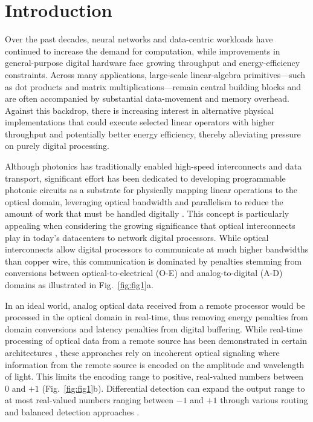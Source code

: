 \documentclass[%
 aip,
 apl,
 amsmath,amssymb,
 reprint,%
 floatfix,
]{revtex4-1}
\begin{document}
\maketitle

\section{Introduction}

Over the past decades, neural networks and data-centric workloads have continued to increase the demand for computation, while improvements in general-purpose digital hardware face growing throughput and energy-efficiency constraints. Across many applications, large-scale linear-algebra primitives---such as dot products and matrix multiplications---remain central building blocks and are often accompanied by substantial data-movement and memory overhead. Against this backdrop, there is increasing interest in alternative physical implementations that could execute selected linear operators with higher throughput and potentially better energy efficiency, thereby alleviating pressure on purely digital processing.

Although photonics has traditionally enabled high-speed interconnects and data transport, significant effort has been dedicated to developing programmable photonic circuits as a substrate for physically mapping linear operations to the optical domain, leveraging optical bandwidth and parallelism to reduce the amount of work that must be handled digitally \cite{Bogaerts2020Nature_ProgrammablePICs_Review,Tait2014JLT_BroadcastAndWeight,Feldmann2021Nature_PhotonicTensorCore,Tait2017SciRep_NeuromorphicWeightBanks,Shen2017NatPhoton_CoherentNanophotonicDL,Hamerly2019PRX_PhotoelectricMultiplication}. This concept is particularly appealing when considering the growing significance that optical interconnects play in today's datacenters to network digital processors. While optical interconnects allow digital processors to communicate at much higher bandwidths than copper wire, this communication is dominated by penalties stemming from conversions between optical-to-electrical (O-E) and analog-to-digital (A-D) domains as illustrated in Fig.~\ref{fig:fig1}a.

In an ideal world, analog optical data received from a remote processor would be processed in the optical domain in real-time, thus removing energy penalties from domain conversions and latency penalties from digital buffering. While real-time processing of optical data from a remote source has been demonstrated in certain architectures \cite{Xu2021Nature_11TOPS_ConvAccelerator,Hamerly2024JLT_Netcast,Sludds2022Science_NetcastEdge}, these approaches rely on incoherent optical signaling where information from the remote source is encoded on the amplitude and wavelength of light. This limits the encoding range to positive, real-valued numbers between 0 and $+1$ (Fig.~\ref{fig:fig1}b). Differential detection can expand the output range to at most real-valued numbers ranging between $-1$ and $+1$ through various routing and balanced detection approaches \cite{Tait2017SciRep_NeuromorphicWeightBanks,Tait2014JLT_BroadcastAndWeight}.
\end{document}

